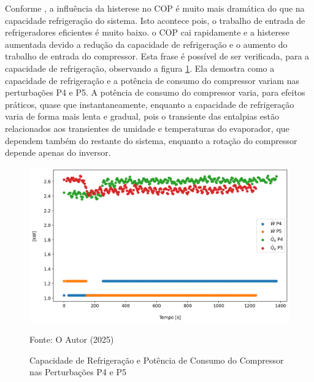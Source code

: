 Conforme \textcite{MASCHE2021302}, a influência da histerese no COP é muito mais dramática do que na capacidade refrigeração do sistema. Isto acontece pois, o trabalho de entrada de refrigeradores eficientes é muito baixo. o COP cai rapidamente e a histerese aumentada devido a redução da capacidade de refrigeração e o aumento do trabalho de entrada do compressor. Esta frase é possível de ser verificada, para a capacidade de refrigeração, observando a figura \ref{fig:Capacidade de Resfriamento e Potência de Entrada do Compressor P4 e P5}. Ela demostra como a capacidade de refrigeração e a potência de consumo do compressor variam nas perturbações P4 e P5. A potência de consumo do compressor varia, para efeitos práticos, quase que instantaneamente, enquanto a capacidade de refrigeração varia de forma mais lenta e gradual, pois o transiente das entalpias estão relacionados aos transientes de umidade e temperaturas do evaporador, que dependem também do restante do sistema, enquanto a rotação do compressor depende apenas do inversor.
\newpage
\begin{figure}[h]
    \centering
    \includegraphics[width=1\linewidth]{FigurasdoTexto/Qe e W Histerese.png}
    \caption{Capacidade de Refrigeração e Potência de Consumo do Compressor nas Perturbações P4 e P5}
    \label{fig:Capacidade de Resfriamento e Potência de Entrada do Compressor P4 e P5}
    {\footnotesize Fonte: O Autor (2025)}
\end{figure}

